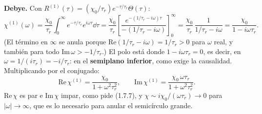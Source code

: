  \textbf{Debye.} Con $R^{(1)}(\tau)=(\chi_0/\tau_r)e^{-\tau/\tau_r}\Theta(\tau)$:
\[
\chi^{(1)}(\omega)=\frac{\chi_0}{\tau_r}\int_0^\infty e^{-\tau/\tau_r}e^{i\omega\tau}\dd\tau=\frac{\chi_0}{\tau_r}\left[\frac{e^{-(1/\tau_r-i\omega)\tau}}{-(1/\tau_r-i\omega)}\right]_0^\infty
=\frac{\chi_0}{\tau_r}\,\frac{1}{1/\tau_r-i\omega}=\frac{\chi_0}{1-i\omega\tau_r}.
\]
(El término en $\infty$ se anula porque $\mathrm{Re}(1/\tau_r-i\omega)=1/\tau_r>0$ para $\omega$ real, y también para todo $\mathrm{Im}\,\omega>-1/\tau_r$.)
El polo está donde $1-i\omega\tau_r=0$, es decir, en $\omega=1/(i\tau_r)=-i/\tau_r$: en el \textbf{semiplano inferior}, como exige la causalidad. Multiplicando
por el conjugado:
\[
\mathrm{Re}\,\chi^{(1)}=\frac{\chi_0}{1+\omega^2\tau_r^2},\qquad \mathrm{Im}\,\chi^{(1)}=\frac{\chi_0\,\omega\tau_r}{1+\omega^2\tau_r^2}.
\]
$\mathrm{Re}\,\chi$ es par e $\mathrm{Im}\,\chi$ impar, como pide (1.7.7), y $\chi\sim i\chi_0/(\omega\tau_r)\to0$ para $|\omega|\to\infty$, que es lo necesario para
anular el semicírculo grande.

